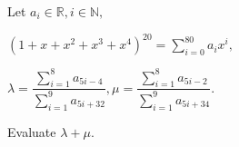 Let $a_i \in \mathbb{R},i \in \mathbb{N},$



$(1 + x + x^2 + x^3 + x^4)^{20} = \sum_{i=0}^{80} a_i x^i,$



$\lambda = \dfrac{\sum_{i = 1}^{8} a_{5i - 4}}{\sum_{i = 1}^{9} a_{5i + 32}}, \mu = \dfrac{\sum_{i = 1}^{8} a_{5i - 2}}{\sum_{i = 1}^{9} a_{5i + 34}}.$



Evaluate $\lambda + \mu$.

